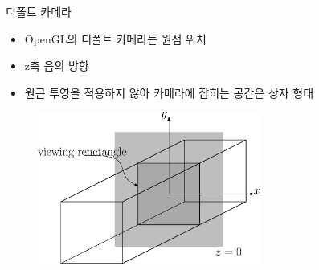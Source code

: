 \documentclass{beamer}
\begin{document}
\begin{frame}[fragile]{디폴트 카메라}

\begin{itemize}
\item OpenGL의 디폴트 카메라는 원점 위치
\item z축 음의 방향
\item 원근 투영을 적용하지 않아 카메라에 잡히는 공간은 상자 형태
\end{itemize}

\begin{figure}
    \includegraphics[height=5cm]{OGL_opengl/defaultCam.eps}
\end{figure}


\end{frame}
\end{document}
